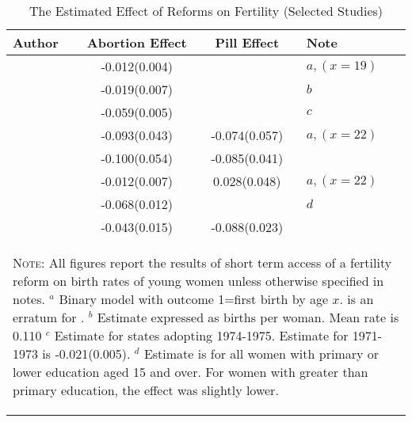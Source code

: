 \documentclass{article}
\begin{document}
\begin{spacing}{1.4}
\begin{table}[htpb!]
\caption{The Estimated Effect of Reforms on Fertility (Selected Studies)}
\begin{tabular}{lccl} \toprule
Author & Abortion Effect & Pill Effect & Note \\ \midrule
\citet{AngristEvans1996}      & -0.012(0.004) &               & $a,(x=19)$   \\
\citet{Levineetal1996}        & -0.019(0.007) &               & $b$          \\
\citet{Gruberetal1999}        & -0.059(0.005) &               & $c$          \\
\citet{Bailey2006}            & -0.093(0.043) & -0.074(0.057) & $a,(x=22)$ \\
\citet{Guldi2008}             & -0.100(0.054) & -0.085(0.041) &              \\
\citet{Bailey2009}            & -0.012(0.007) &  0.028(0.048) & $a,(x=22)$ \\
\citet{PopEleches2005}        & -0.068(0.012) &               & $d       $ \\
\citet{OltmansHungerman2012}  & -0.043(0.015) & -0.088(0.023) &              \\
\bottomrule
\multicolumn{4}{p{12.2cm}}{\begin{footnotesize}\textsc{Note:} All figures report 
the results of short term access of a fertility reform on birth rates of young 
women unless otherwise specified in notes. \newline 
$^a$ Binary model with outcome 1=first birth by age $x$. \citet{Bailey2009} is
an erratum for \citeyear{Bailey2006}.\newline
$^b$ Estimate expressed as births per woman.  Mean rate is 0.110 \newline 
$^c$ Estimate for states adopting 1974-1975. Estimate for 1971-1973 is 
-0.021(0.005). \newline
$^d$ Estimate is for all women with primary or lower education aged 15 and over.
For women with greater than primary education, the effect was slightly lower.
 \newline 
\end{footnotesize}} \\
\end{tabular}
\end{table}


\end{spacing}
\end{document}
